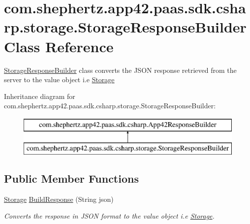 \hypertarget{classcom_1_1shephertz_1_1app42_1_1paas_1_1sdk_1_1csharp_1_1storage_1_1_storage_response_builder}{\section{com.\+shephertz.\+app42.\+paas.\+sdk.\+csharp.\+storage.\+Storage\+Response\+Builder Class Reference}
\label{classcom_1_1shephertz_1_1app42_1_1paas_1_1sdk_1_1csharp_1_1storage_1_1_storage_response_builder}
}


\hyperlink{classcom_1_1shephertz_1_1app42_1_1paas_1_1sdk_1_1csharp_1_1storage_1_1_storage_response_builder}{Storage\+Response\+Builder} class converts the J\+S\+O\+N response retrieved from the server to the value object i.\+e \hyperlink{classcom_1_1shephertz_1_1app42_1_1paas_1_1sdk_1_1csharp_1_1storage_1_1_storage}{Storage}  


Inheritance diagram for com.\+shephertz.\+app42.\+paas.\+sdk.\+csharp.\+storage.\+Storage\+Response\+Builder\+:\begin{figure}[H]
\begin{center}
\leavevmode
\includegraphics[height=2.000000cm]{classcom_1_1shephertz_1_1app42_1_1paas_1_1sdk_1_1csharp_1_1storage_1_1_storage_response_builder}
\end{center}
\end{figure}
\subsection*{Public Member Functions}
\begin{DoxyCompactItemize}
\item 
\hyperlink{classcom_1_1shephertz_1_1app42_1_1paas_1_1sdk_1_1csharp_1_1storage_1_1_storage}{Storage} \hyperlink{classcom_1_1shephertz_1_1app42_1_1paas_1_1sdk_1_1csharp_1_1storage_1_1_storage_response_builder_add7da4de788fc83a503b99817240fa82}{Build\+Response} (String json)
\begin{DoxyCompactList}\small\item\em Converts the response in J\+S\+O\+N format to the value object i.\+e \hyperlink{classcom_1_1shephertz_1_1app42_1_1paas_1_1sdk_1_1csharp_1_1storage_1_1_storage}{Storage}. \end{DoxyCompactList}\end{DoxyCompactItemize}
